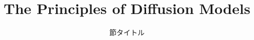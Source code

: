 
\title{The Principles of Diffusion Models}
\subtitle{節タイトル}


\begin{frame}
    \titlepage
\end{frame}



